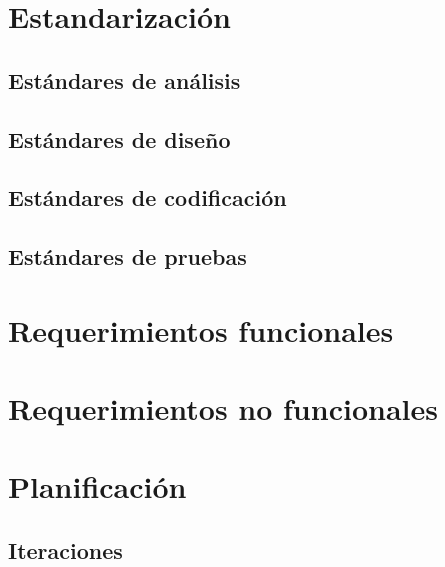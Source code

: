 \section{Estandarización}
\subsection{Estándares de análisis}
\subsection{Estándares de diseño}
\subsection{Estándares de codificación}
\subsection{Estándares de pruebas}

\section{Requerimientos funcionales}
\section{Requerimientos no funcionales}

\section{Planificación}
\subsection{Iteraciones}
